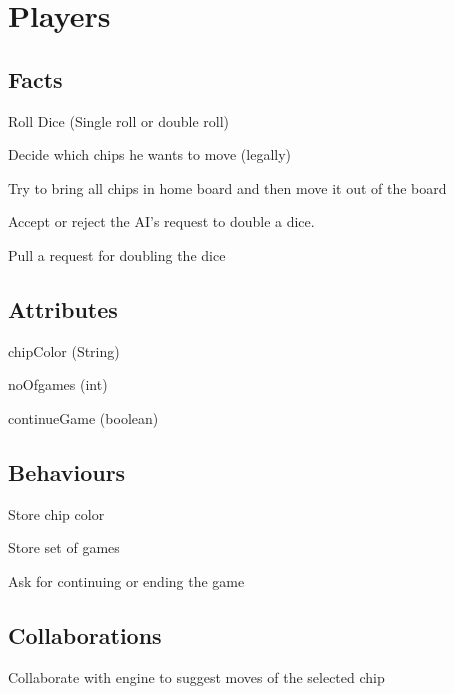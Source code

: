 \documentclass{report}
\begin{document}
\section{Players}

\subsection{Facts}

\begin{dashed}
    \item Roll Dice (Single roll or double roll)
    \item Decide which chips he wants to move (legally)
    \item Try to bring all chips in home board and then move it out of the board
    \item Accept or reject the AI's request to double a dice.
    \item Pull a request for doubling the dice
\end{dashed}

\subsection{Attributes}

    \begin{dashed}
        \item chipColor (String)
        \item noOfgames (int)
        \item continueGame (boolean)
    \end{dashed}

\subsection{Behaviours}

    \begin{dashed}
        \item Store chip color
        \item Store set of games
        \item Ask for continuing or ending the game
    \end{dashed}

\subsection{Collaborations}

    \begin{dashed}
        \item Collaborate with engine to suggest moves of the selected chip
    \end{dashed}
\end{document}
